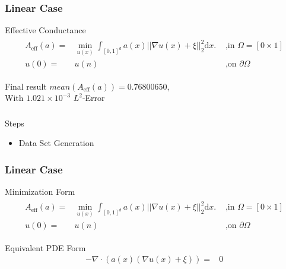\documentclass{beamer}
\begin{document}
\begin{frame}
	\frametitle{Linear Case}
	
	\begin{block}{Effective Conductance}
		\begin{align*} 	
		\begin{array}{rll}
		A_{\mathrm{eff}}(a) = &\min_{u(x)} \int_{[0,1]^d} a(x) ||\nabla u(x) + \xi||_{2}^{2} \mathrm{d}x.&\text{ ,in }\Omega = [0\times 1]\\ 
		u(0) = &u(n) &\text{ ,on }\partial \Omega 
		\end{array}
		\end{align*}	
	\end{block}
	\begin{block}{Final result}
	$mean(A_{\mathrm{eff}}(a)) = 0.76800650$,\\
	With $1.021 \times 10^{-3}$ $L^2$-Error
	\end{block}
\end{frame}

\begin{frame}
	\frametitle{}	
	\begin{block}{Steps}
		\begin{itemize}
			\item Data Set Generation 
		\end{itemize}	
	\end{block}
\end{frame}

\begin{frame}
	\frametitle{Linear Case}
	
	\begin{block}{Minimization Form}
		\begin{align*} 	
		\begin{array}{rll}
		A_{\mathrm{eff}}(a) = &\min_{u(x)} \int_{[0,1]^d} a(x) ||\nabla u(x) + \xi||_{2}^{2} \mathrm{d}x.&\text{ ,in }\Omega = [0\times 1]\\ 
		u(0) = &u(n) &\text{ ,on }\partial \Omega 
		\end{array}
		\end{align*}	
	\end{block}
	\begin{block}{Equivalent PDE Form}	
		\begin{align*}
	-\nabla \cdot (a(x)(\nabla u(x)+\xi)) = &0
		\end{align*}	
	\end{block}
\end{frame}
\end{document}
